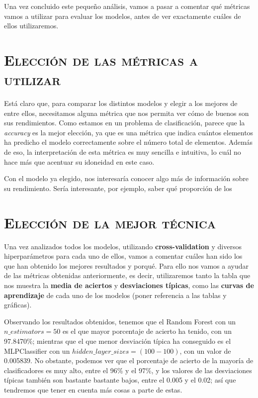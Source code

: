 \documentclass[11pt,a4paper]{article}
\begin{document}
Una vez concluido este pequeño análisis, vamos a pasar a comentar qué métricas vamos a utilizar para evaluar los modelos, antes de ver
exactamente cuáles de ellos utilizaremos.

\newpage

\section{\textsc{Elección de las métricas a utilizar}}

Está claro que, para comparar los distintos modelos y elegir a los mejores de entre ellos, necesitamos alguna métrica que nos permita
ver cómo de buenos son sus rendimientos. Como estamos en un problema de clasificación, parece que la \textit{accuracy} es la mejor elección,
ya que es una métrica que indica cuántos elementos ha predicho el modelo correctamente sobre el número total de elementos. Además de eso,
la interpretación de esta métrica es muy sencilla e intuitiva, lo cuál no hace más que acentuar su idoneidad en este caso.

Con el modelo ya elegido, nos interesaría conocer algo más de información sobre su rendimiento. Sería interesante, por ejemplo, saber
qué proporción de los

\newpage

\section{\textsc{Elección de la mejor técnica}}

Una vez analizados todos los modelos, utilizando \textbf{cross-validation} y diversos hiperparámetros para cada uno de ellos, vamos a
comentar cuáles han sido los que han obtenido los mejores resultados y porqué. Para ello nos vamos a ayudar de las métricas obtenidas
anteriormente, es decir, utilizaremos tanto la tabla que nos muestra la \textbf{media de aciertos} y \textbf{desviaciones típicas}, como
las \textbf{curvas de aprendizaje} de cada uno de los modelos (poner referencia a las tablas y gráficas).

Observando los resultados obtenidos, tenemos que el Random Forest con un $n\_estimators = 50$ es el que mayor porcentaje de acierto ha
tenido, con un 97.8470\%; mientras que el que menor desviación típica ha conseguido es el MLPClassifier con un $hidden\_layer\_sizes =
(100-100)$, con un valor de 0.005839. No obstante, podemos ver que el porcentaje de acierto de la mayoría de clasificadores es muy alto,
entre el 96\% y el 97\%, y los valores de las desviaciones típicas también son bastante bastante bajos, entre el 0.005 y el 0.02; así que
tendremos que tener en cuenta más cosas a parte de estas.
\end{document}
